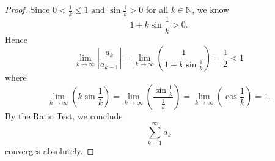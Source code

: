 \documentclass{report}
\begin{document}
\setcounter{Exercise}{4}
\vspace{12pt}
\begin{Exercise}
\begin{proof}
Since $0<\frac{1}{k}\leq1 \mbox{ and } \sin{\frac{1}{k}} > 0$ for all $k\in\mathbb{N}$, we know $$ 1+k\sin{\frac{1}{k}} > 0.$$
Hence $$ \lim_{k\to\infty}\left|\frac{a_k}{a_{k-1}}\right| = \lim_{k\to\infty}\left(\frac{1}{1+k\sin{\frac{1}{k}}}\right) = \frac{1}{2} < 1 $$ where $$ \lim_{k\to\infty}\left(k\sin{\frac{1}{k}}\right) = \lim_{k\to\infty}\left(\frac{\sin{\frac{1}{k}}}{\frac{1}{k}}\right) = \lim_{k\to\infty}\left(\cos{\frac{1}{k}}\right) = 1.$$
By the Ratio Test, we conclude $$\sum_{k=1}^{\infty}a_k$$ converges absolutely.
\end{proof}
\end{Exercise}
\end{document}
